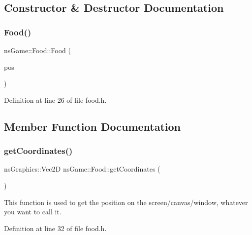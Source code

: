 \subsection{Constructor \& Destructor Documentation}
\mbox{\label{classns_game_1_1_food_a7c7420d787be8025d23447bd24e7c2f4}} 
\subsubsection{\texorpdfstring{Food()}{Food()}}
{\footnotesize\ttfamily ns\+Game\+::\+Food\+::\+Food (\begin{DoxyParamCaption}\item[{ns\+Graphics\+::\+Vec2D}]{pos }\end{DoxyParamCaption})\hspace{0.3cm}{\ttfamily [inline]}}



Definition at line 26 of file food.\+h.



\subsection{Member Function Documentation}
\mbox{\label{classns_game_1_1_food_a65337270b0da5319663117449547118c}} 
\subsubsection{\texorpdfstring{get\+Coordinates()}{getCoordinates()}}
{\footnotesize\ttfamily ns\+Graphics\+::\+Vec2D ns\+Game\+::\+Food\+::get\+Coordinates (\begin{DoxyParamCaption}{ }\end{DoxyParamCaption})\hspace{0.3cm}{\ttfamily [inline]}}



This function is used to get the position on the screen/canvas/window, whatever you want to call it. 



Definition at line 32 of file food.\+h.

